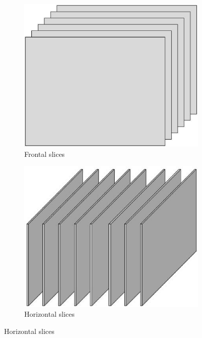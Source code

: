\documentclass[letterpaper,12pt]{article}
\begin{document}
\begin{figure}[!ht]
 \centering
 \begin{subfigure}[b]{0.29\textwidth}
  \includegraphics[width=\textwidth]{Images/slices-frontal.eps}
  \caption{Frontal slices}\label{fig:3tensor-frontalslices}
 \end{subfigure}
 \begin{subfigure}[b]{0.33\textwidth}
  \includegraphics[width=\textwidth]{Images/slices-horizontal.eps}
  \caption{Horizontal slices}\label{fig:3tensor-horizontalslices}
 \end{subfigure}

\end{figure}
\end{document}
